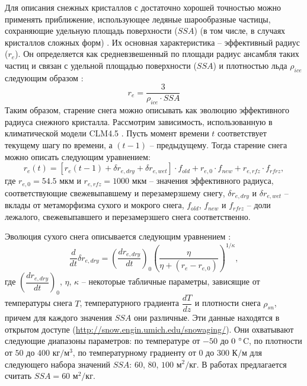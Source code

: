 \documentclass[a4paper, fontsize=14pt]{scrartcl}
\begin{document}
\newpage
Для описания снежных кристаллов с достаточно хорошей точностью можно применять приближение, использующее ледяные шарообразные частицы, сохраняющие удельную площадь поверхности ($SSA$) (в том числе, в случаях кристаллов сложных форм) \cite{Grenfell1999}. Их основная характеристика -- эффективный радиус ($r_e$). Он определяется как средневзвешенный по площади радиус ансамбля таких частиц и связан с удельной площадью поверхности ($SSA$) и плотностью льда $\rho_{ice}$ следующим образом \cite{Flanner2006}:  
\begin{equation}
    r_e = \dfrac{3} {\rho_{ice} \cdot SSA} \label{sys}
\end{equation}
Таким образом, старение снега можно описывать как эволюцию эффективного радиуса снежного кристалла. Рассмотрим зависимость, использованную в климатической модели CLM4.5 \cite{CLM4.5tech}. Пусть момент времени $t$ соответствует текущему шагу по времени, а $(t - 1)$ -- предыдущему. Тогда старение снега можно описать следующим уравнением:
\begin{equation}
    r_e(t) = [r_e (t - 1) + \delta r_{e , dry} + \delta r_{e , wet} ] \cdot f_{old} + r_{e ,0} \cdot f_{new} + r_{e , rfz} \cdot f_{rfrz}, \label{sysRDS1}
\end{equation}
где $ r_{e ,0} = 54.5 $ мкм и $r_{e , rfz} = 1000 $ мкм -- значения эффективного радиуса, соответствующие свежевыпавшему и перезамерзшему снегу, $\delta r_{e , dry}$ и $\delta r_{e , wet}$ -- вклады от метаморфизма сухого и мокрого снега, $f_{old}$, $f_{new}$ и $f_{rfrz}$ -- доли лежалого, свежевыпавшего и перезамерзшего снега соответственно.  

Эволюция сухого снега описывается следующим уравнением \cite{Flanner2006, Flanner2007, CLM4.5tech}:
\begin{equation}
    \dfrac{d}{dt} \delta r_{e , dry} = {\left( \dfrac{dr_{e , dry}}{dt} \right)}_0 \left(\dfrac{\eta}{\eta + (r_e - r_{e, 0})}\right)^{1 / \kappa}, \label{sys}
\end{equation}
где ${\left( \dfrac{dr_{e , dry}}{dt} \right)}_0$, $\eta$, $\kappa$ -- некоторые табличные параметры, зависящие от температуры снега $T$, температурного градиента $\dfrac{dT}{dz}$ и плотности снега $\rho_{sn}$, причем для каждого значения $SSA$ они различные. Эти данные находятся в открытом доступе (\url{http://snow.engin.umich.edu/snowaging/}). Они охватывают следующие диапазоны параметров: по температуре от $-50$ до $0 ~\degree$C, по плотности от $50$ до $400$ кг$/$м$^3$, по температурному градиенту от $0$ до $300$ К$/$м для следующего набора значений $SSA$: $60$, $80$, $100$ м$^2/$кг. В работах \cite{CLM4.5tech, Flanner2006, Flanner2007} предлагается считать $SSA = 60$ м$^2/$кг.
\end{document}
